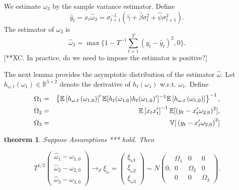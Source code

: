 \documentclass[11pt, letterpaper, twoside, final]{article}
\newtheorem{lemma}{theorem}
\begin{document}
We estimate $\omega_{3}$ by the sample variance estimator. 
Define 
%
\begin{equation}
    \widehat{y}_{t} = x_{t}\widehat{\omega}_{2} = \sigma_{t+1}^{-1}(\widehat{\gamma}+\widehat{\beta
   }\sigma_{t}^{2}+\widehat{\psi}\sigma_{t+1}^{2}).
\end{equation}
%
The estimator of $\omega_{3}$ is 
\begin{equation}
    \widehat{\omega}_{3} = \max \{1-T^{-1}\sum_{t = 1}^{T}\left( y_{t}-\widehat{y}_{t}\right) ^{2},0\}.
\end{equation}%
[**XC. In practice, do we need to impose the estimator is positive?]

The next lemma provides the asymptotic distribution of the estimator $\widehat{\omega}$. 
Let $h_{\omega ,t}(\omega_{1})\in \mathbb{R}^{5\times 2}$ denote the derivative of $h_{t}(\omega_{1})$ w.r.t.\@
$\omega_{1}$.
Define
%
\begin{eqnarray}
    \Omega_{1} & = &\left \{ \mathbb{E}\left[ h_{\omega ,t}\left( \omega _{1,0}\right) \right]^{\prime}
        \mathbb{E}[h_{t}(\omega_{1,0})h_{t}(\omega _{1,0})^{\prime}]^{-1}\mathbb{E}\left[
    h_{\omega,t}\left(\omega_{1,0}\right) \right] \right \} ^{-1},  \notag \\ 
%
    \Omega_{2} & = &\mathbb{E}\left[ x_{t}x_{t}^{\prime}\right] ^{-1}\mathbb{E[(} y_{t}-x_{t}^{\prime
   }\omega_{2,0})^{2}],  \notag \\
%
    \Omega_{3} & = &\mathbb{V[}\left( y_{t}-x_{t}^{\prime}\omega_{2,0}\right)^{2}]
\end{eqnarray}

\begin{lemma}
Suppose Assumptions *** hold. Then

\begin{equation}
    T^{1/2}\left( 
%
    \begin{array}{c}
        \widehat{\omega}_{1}-\omega_{1,0} \\ 
        \widehat{\omega}_{2}-\omega_{2,0} \\ 
        \widehat{\omega}_{3}-\omega_{3,0}%
    \end{array}\right) 
%
    \rightarrow_{d}\xi_{\omega}  = 
%
   \left(\begin{array}{c}
            \xi_{\omega 1} \\ 
            \xi_{\omega 2} \\ 
            \xi_{\omega 3}%
   \end{array}\right) 
%
   \sim N\left( 0,
%
    \begin{array}{ccc}
        \Omega_{1} & 0 & 0 \\ 
        0 & \Omega_{2} & 0 \\ 
        0 & 0 & \Omega_{3}%
    \end{array}\right).
\end{equation}
\end{lemma}
\end{document}
